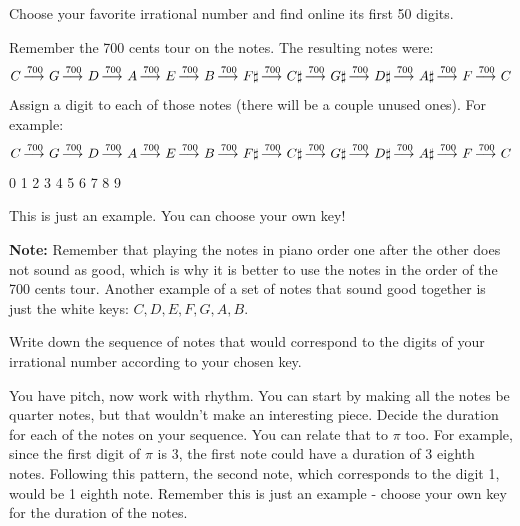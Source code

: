 \documentclass[12pt,noauthor,nooutcomes,hints,instructornotes]{ximera}%
\begin{document}
\begin{question}
     Choose your favorite irrational number and find online its first 50 digits. \end{question}
    \begin{question} Remember the 700 cents tour on the notes. The resulting notes were:
    \[
C \mathop{\longrightarrow\,}\limits^{700} G \mathop{\longrightarrow\,}\limits^{700} D \mathop{\longrightarrow\,}\limits^{700} A \mathop{\longrightarrow\,}\limits^{700} E \mathop{\longrightarrow\,}\limits^{700} B \mathop{\longrightarrow\,}\limits^{700} F\sharp \mathop{\longrightarrow\,}\limits^{700} C\sharp\mathop{\longrightarrow\,}\limits^{700} G\sharp \mathop{\longrightarrow\,}\limits^{700} D\sharp \mathop{\longrightarrow\,}\limits^{700} A\sharp \mathop{\longrightarrow\,}\limits^{700} F \mathop{\longrightarrow\,}\limits^{700} C
\]
    Assign a digit to each of those notes (there will be a couple unused ones). For example:
    \[
C \mathop{\longrightarrow\,}\limits^{700} G \mathop{\longrightarrow\,}\limits^{700} D \mathop{\longrightarrow\,}\limits^{700} A \mathop{\longrightarrow\,}\limits^{700} E \mathop{\longrightarrow\,}\limits^{700} B \mathop{\longrightarrow\,}\limits^{700} F\sharp \mathop{\longrightarrow\,}\limits^{700} C\sharp\mathop{\longrightarrow\,}\limits^{700} G\sharp \mathop{\longrightarrow\,}\limits^{700} D\sharp \mathop{\longrightarrow\,}\limits^{700} A\sharp \mathop{\longrightarrow\,}\limits^{700} F \mathop{\longrightarrow\,}\limits^{700} C
\] 
\hspace{15 pt}
    0 \hspace{18 pt} 1 \hspace{18 pt} 2 \hspace{18 pt} 3 \hspace{18 pt} 4 \hspace{18 pt} 5 \hspace{18 pt} 6 \hspace{22 pt} 7 \hspace{22 pt} 8 \hspace{22 pt} 9

This is just an example. You can choose your own key!

\textbf{Note:} Remember that playing the notes in piano order one after the other does not sound as good, which is why it is better to use the notes in the order of the 700 cents tour. Another example of a set of notes that sound good together is just the white keys: $C, D, E, F, G, A, B$.
\end{question}
   \begin{question} Write down the sequence of notes that would correspond to the digits of your irrational number according to your chosen key. 
\end{question}  
\begin{question}
You have pitch, now work with rhythm. You can start by making all the notes be quarter notes, but that wouldn't make an interesting piece. Decide the duration for each of the notes on your sequence. You can relate that to $\pi$ too. For example, since the first digit of $\pi$ is 3, the first note could have a duration of 3 eighth notes. Following this pattern, the second note, which corresponds to the digit 1, would be 1 eighth note. Remember this is just an example - choose your own key for the duration of the notes. \end{question}
\end{document}
